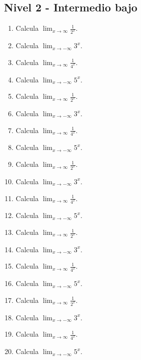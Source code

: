 \documentclass[11pt,a4paper]{article}
\begin{document}
\subsection{Nivel 2 - Intermedio bajo}

\begin{enumerate}[label=\textbf{E\arabic*.},start=321]

\item Calcula $\displaystyle\lim_{x\to\infty}\frac{1}{2^x}$.

\item Calcula $\displaystyle\lim_{x\to-\infty}3^x$.

\item Calcula $\displaystyle\lim_{x\to\infty}\frac{1}{4^x}$.

\item Calcula $\displaystyle\lim_{x\to-\infty}5^x$.

\item Calcula $\displaystyle\lim_{x\to\infty}\frac{1}{2^x}$.

\item Calcula $\displaystyle\lim_{x\to-\infty}3^x$.

\item Calcula $\displaystyle\lim_{x\to\infty}\frac{1}{4^x}$.

\item Calcula $\displaystyle\lim_{x\to-\infty}5^x$.

\item Calcula $\displaystyle\lim_{x\to\infty}\frac{1}{2^x}$.

\item Calcula $\displaystyle\lim_{x\to-\infty}3^x$.

\item Calcula $\displaystyle\lim_{x\to\infty}\frac{1}{4^x}$.

\item Calcula $\displaystyle\lim_{x\to-\infty}5^x$.

\item Calcula $\displaystyle\lim_{x\to\infty}\frac{1}{2^x}$.

\item Calcula $\displaystyle\lim_{x\to-\infty}3^x$.

\item Calcula $\displaystyle\lim_{x\to\infty}\frac{1}{4^x}$.

\item Calcula $\displaystyle\lim_{x\to-\infty}5^x$.

\item Calcula $\displaystyle\lim_{x\to\infty}\frac{1}{2^x}$.

\item Calcula $\displaystyle\lim_{x\to-\infty}3^x$.

\item Calcula $\displaystyle\lim_{x\to\infty}\frac{1}{4^x}$.

\item Calcula $\displaystyle\lim_{x\to-\infty}5^x$.

\end{enumerate}
\end{document}
